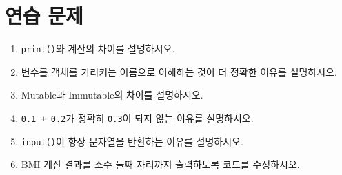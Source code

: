 \documentclass[11pt,a4paper]{article}
\begin{document}
\section{연습 문제}

\begin{enumerate}
  \item \texttt{print()}와 계산의 차이를 설명하시오.
  \item 변수를 객체를 가리키는 이름으로 이해하는 것이 더 정확한 이유를 설명하시오.
  \item Mutable과 Immutable의 차이를 설명하시오.
  \item \texttt{0.1 + 0.2}가 정확히 \texttt{0.3}이 되지 않는 이유를 설명하시오.
  \item \texttt{input()}이 항상 문자열을 반환하는 이유를 설명하시오.
  \item BMI 계산 결과를 소수 둘째 자리까지 출력하도록 코드를 수정하시오.
\end{enumerate}
\end{document}
